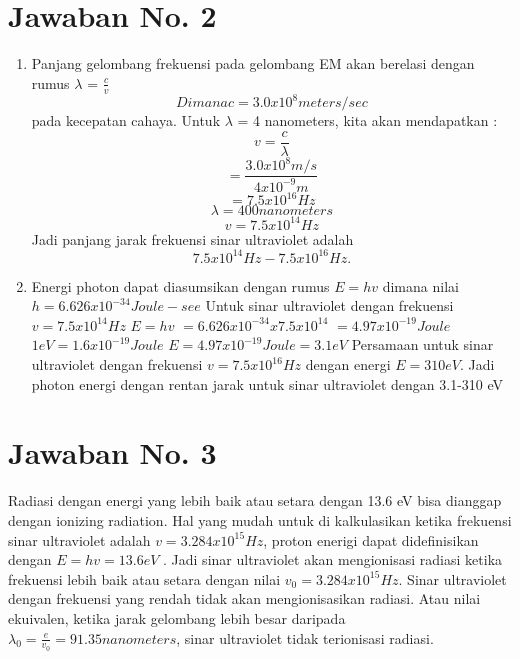 \section{Jawaban No. 2}
\begin{enumerate}
\item Panjang gelombang frekuensi pada gelombang EM akan berelasi dengan rumus $\lambda$ = $ \frac{c}{v}$
\subitem\begin{displaymath}Dimana \textit{c} = 3.0 x 10^{8} meters/sec \end{displaymath} pada kecepatan cahaya. Untuk $\lambda$ = 4 nanometers, kita akan mendapatkan :
\subitem  $$ v =\frac{c}{\lambda}$$
\subitem  $$ = \frac{ 3.0 x 10^{8}m/s}{4 x 10^{-9}m}$$
\subitem \begin{displaymath}= 7.5 x 10^{16}Hz\end{displaymath}
\subitem$$\lambda = 400{nanometers}$$ 
\subitem \begin{displaymath}v = 7.5 x 10^{14}Hz\end{displaymath}
\subitem Jadi panjang jarak frekuensi sinar ultraviolet adalah
\begin{displaymath}
7.5 x 10^{14}Hz - 7.5 x 10^{16}Hz.
\end{displaymath}
\item Energi photon dapat diasumsikan dengan rumus $E = hv$ dimana nilai $h = 6.626 x 10^{-34} Joule-see$ Untuk sinar ultraviolet dengan frekuensi $v = 7.5 x 10^{14}Hz$
\subitem$E = hv$
\subitem $=  6.626 x 10^{-34} x 7.5 x 10^{14}$
\subitem $=  4.97 x 10^{-19} Joule$
\subitem $1 eV = 1.6 x 10^{-19} Joule$
\subitem $E = 4.97 x 10^{-19} Joule = 3.1 eV$
\subitem Persamaan untuk sinar ultraviolet dengan frekuensi $v = 7.5 x 10^{16}Hz$ dengan energi $E = 310 eV$. Jadi photon energi dengan rentan jarak untuk sinar ultraviolet dengan 3.1-310 eV 
\end{enumerate}

\section{Jawaban No. 3}
Radiasi dengan energi yang lebih baik atau setara dengan 13.6 eV bisa dianggap dengan ionizing radiation. Hal yang mudah untuk di kalkulasikan ketika frekuensi sinar ultraviolet adalah $v = 3.284 x 10^{15} Hz$, proton enerigi dapat didefinisikan dengan $E = hv = 13.6 eV$ . Jadi sinar ultraviolet akan mengionisasi radiasi ketika frekuensi lebih baik atau setara dengan nilai $v_{0} = 3.284 x 10^{15}Hz$. Sinar ultraviolet dengan frekuensi yang rendah tidak akan mengionisasikan radiasi. Atau nilai ekuivalen, ketika jarak gelombang lebih besar daripada $\lambda_{0} = \frac{e}{v_{0}} = 91.35 nanometers$, sinar ultraviolet tidak terionisasi radiasi. 